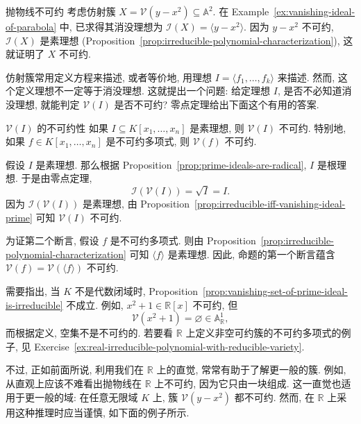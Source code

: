 \begin{Example}{抛物线不可约}\leavevmode\label{ex:parabola-is-irreducible}
  考虑仿射簇 $X=\mathcal{V}(y-x^{2})\subseteq\mathbb{A}^{2}$. 在 Example~\ref{ex:vanishing-ideal-of-parabola} 中, 已求得其消没理想为 $\mathcal{I}(X)=\langle y-x^{2}\rangle$. 因为 $y-x^{2}$ 不可约, $\mathcal{I}(X)$ 是素理想 (Proposition~\ref{prop:irreducible-polynomial-characterization}), 这就证明了 $X$ 不可约.
\end{Example}

仿射簇常用定义方程来描述, 或者等价地, 用理想 $I=\langle f_{1},\ldots,f_{k}\rangle$ 来描述. 然而, 这个定义理想不一定等于消没理想. 这就提出一个问题: 给定理想 $I$, 是否不必知道消没理想, 就能判定 $\mathcal{V}(I)$ 是否不可约? 零点定理给出下面这个有用的答案.

\begin{Proposition}{$\mathcal{V}(I)$ 的不可约性}\leavevmode\label{prop:vanishing-set-of-prime-ideal-is-irreducible}
  如果 $I\subseteq K[x_{1},\ldots,x_{n}]$ 是素理想, 则 $\mathcal{V}(I)$ 不可约. 特别地, 如果 $f\in K[x_{1},\ldots,x_{n}]$ 是不可约多项式, 则 $\mathcal{V}(f)$ 不可约.
\end{Proposition}

\begin{Proof}
  假设 $I$ 是素理想. 那么根据 Proposition~\ref{prop:prime-ideals-are-radical}, $I$ 是根理想. 于是由零点定理,
  \[
    \mathcal{I}(\mathcal{V}(I))=\sqrt{I}=I.
  \]
  因为 $\mathcal{I}(\mathcal{V}(I))$ 是素理想, 由 Proposition~\ref{prop:irreducible-iff-vanishing-ideal-prime} 可知 $\mathcal{V}(I)$ 不可约.

  为证第二个断言, 假设 $f$ 是不可约多项式. 则由 Proposition~\ref{prop:irreducible-polynomial-characterization} 可知 $\langle f\rangle$ 是素理想. 因此, 命题的第一个断言蕴含 $\mathcal{V}(f)=\mathcal{V}(\langle f\rangle)$ 不可约.
\end{Proof}

需要指出, 当 $K$ 不是代数闭域时, Proposition~\ref{prop:vanishing-set-of-prime-ideal-is-irreducible} 不成立. 例如, $x^{2}+1\in\mathbb{R}[x]$ 不可约, 但
\[
  \mathcal{V}(x^{2}+1)=\varnothing\in\mathbb{A}^{1}_{\mathbb{R}},
\]
而根据定义, 空集不是不可约的. 若要看 $\mathbb{R}$ 上定义非空可约簇的不可约多项式的例子, 见 Exercise~\ref{ex:real-irreducible-polynomial-with-reducible-variety}.

不过, 正如前面所说, 利用我们在 $\mathbb{R}$ 上的直觉, 常常有助于了解更一般的簇. 例如, 从直观上应该不难看出抛物线在 $\mathbb{R}$ 上不可约, 因为它只由一\textquotedbl{}块\textquotedbl{}组成. 这一直觉也适用于更一般的域: 在任意无限域 $K$ 上, 簇 $\mathcal{V}(y-x^{2})$ 都不可约. 然而, 在 $\mathbb{R}$ 上采用这种推理时应当谨慎, 如下面的例子所示.

